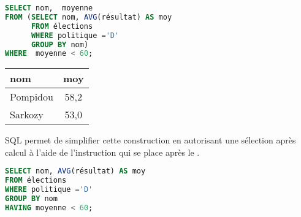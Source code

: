 \begin{minipage}{0.65\linewidth}
\begin{lstlisting}[language=SQL]
SELECT nom,  moyenne 
FROM (SELECT nom, AVG(résultat) AS moy 
      FROM élections
      WHERE politique ='D'
      GROUP BY nom)
WHERE  moyenne < 60;
\end{lstlisting}
\end{minipage}
\begin{minipage}{0.35\linewidth}
\begin{center}
\begin{tabular}{|l|c|}
\hline
{\bf nom} & {\bf moy}\\
  \hline
Pompidou &58,2\\
Sarkozy &53,0\\
\hline
\end{tabular}
\end{center}
\end{minipage}

\medskip

SQL permet de simplifier cette construction en autorisant une sélection après calcul à l'aide de l'instruction  qui se place après le .

\medskip

\begin{lstlisting}[language=SQL]
SELECT nom, AVG(résultat) AS moy
FROM élections 
WHERE politique ='D'
GROUP BY nom
HAVING moyenne < 60;
\end{lstlisting}
